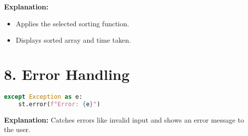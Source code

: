 \documentclass[14pt]{extarticle}
\begin{document}
\textbf{Explanation:}
\begin{itemize}
  \item Applies the selected sorting function.
  \item Displays sorted array and time taken.
\end{itemize}

\section*{8. Error Handling}
\begin{lstlisting}[language=Python]
except Exception as e:
    st.error(f"Error: {e}")
\end{lstlisting}

\textbf{Explanation:} Catches errors like invalid input and shows an error message to the user.
\end{document}
